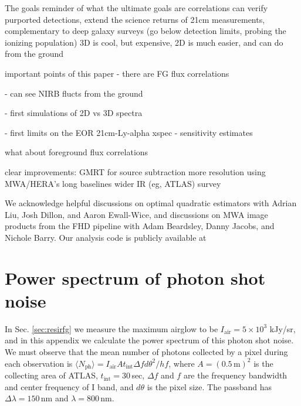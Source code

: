 \documentclass{emulateapj}
\begin{document}
The goals 
reminder of what the ultimate goals are
correlations can verify purported detections, extend the science returns of 21cm measurements, 
complementary to deep galaxy surveys (go below detection limits, probing the ionizing population)
3D is cool, but expensive, 2D is much easier, and can do from the ground



important points of this paper
- there are FG flux correlations

- can see NIRB flucts from the ground

- first simulations of 2D vs 3D spectra

- first limits on the EOR 21cm-Ly-alpha xspec
- sensitivity estimates

what about foreground flux correlations

clear improvements:
GMRT for source subtraction
more resolution using MWA/HERA's long baselines
wider IR (eg, ATLAS) survey


\begin{acknowledgments}
We acknowledge helpful discussions on optimal quadratic estimators with Adrian Liu, Josh Dillon, and Aaron Ewall-Wice, and discussions on MWA image products from the FHD pipeline with Adam Beardsley, Danny Jacobs, and Nichole Barry. Our analysis code is publicly available at 
\end{acknowledgments}

\appendix

\section{Power spectrum of photon shot noise}
\label{sec:Pshot}

In Sec. \ref{sec:resirfg} we measure the maximum airglow to be $I_\text{air}=5\times10^3$ kJy/sr, and in this appendix we calculate the power spectrum of this photon shot noise. We must observe that the mean number of photons collected by a pixel during each observation is $\langle N_\text{ph}\rangle=I_\text{air}At_\text{int} \Delta f d\theta^2/hf$, where $A=(0.5\,\text{m})^2$ is the collecting area of ATLAS, $t_\text{int}=30\,$sec, $\Delta f$ and $f$ are the frequency bandwidth and center frequency of I band, and $d\theta$ is the pixel size. The passband has $\Delta\lambda=150\,$nm and $\lambda=800\,$nm. 
\end{document}
